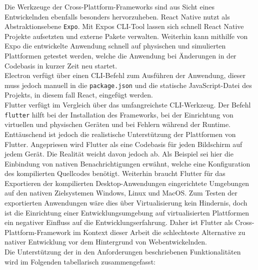 \documentclass[a4paper]{scrartcl}
\begin{document}
Die Werkzeuge der Cross-Plattform-Frameworks sind aus Sicht eines Entwickelnden ebenfalls besonders hervorzuheben. React Native nutzt als Abstraktionsebene \texttt{Expo}. Mit Expos CLI-Tool lassen sich schnell React Native Projekte aufsetzten und externe Pakete verwalten. Weiterhin kann mithilfe von Expo die entwickelte Anwendung schnell auf physischen und simulierten Plattformen getestet werden, welche die Anwendung bei Änderungen in der Codebasis in kurzer Zeit neu startet. \\
Electron verfügt über einen CLI-Befehl zum Ausführen der Anwendung, dieser muss jedoch manuell in die \texttt{package.json} und die statische JavaScript-Datei des Projekts, in diesem fall React, eingefügt werden. \\
Flutter verfügt im Vergleich über das umfangreichste CLI-Werkzeug. Der Befehl \texttt{flutter} hilft bei der Installation des Frameworks, bei der Einrichtung von virtuellen und physischen Geräten und bei Fehlern während der Runtime. \\

Enttäuschend ist jedoch die realistische Unterstützung der Plattformen von Flutter. Angepriesen wird Flutter als eine Codebasis für jeden Bildschirm auf jedem Gerät. Die Realität weicht davon jedoch ab. Als Beispiel sei hier die Einbindung von nativen Benachrichtigungen erwähnt, welche eine Konfiguration des kompilierten Quellcodes benötigt. Weiterhin braucht Flutter für das Exportieren der kompilierten Desktop-Anwendungen eingerichtete Umgebungen auf den nativen Zielsystemen Windows, Linux und MacOS. Zum Testen der exportierten Anwendungen wäre dies über Virtualisierung kein Hindernis, doch ist die Einrichtung einer Entwicklungsumgebung auf virtualisierten Plattformen ein negativer Einfluss auf die Entwicklungserfahrung. Daher ist Flutter als Cross-Plattform-Framework im Kontext dieser Arbeit die schlechteste Alternative zu nativer Entwicklung vor dem Hintergrund von Webentwickelnden. \\

Die Unterstützung der in den Anforderungen beschriebenen Funktionalitäten wird im Folgenden tabellarisch zusammengefasst:
\end{document}
